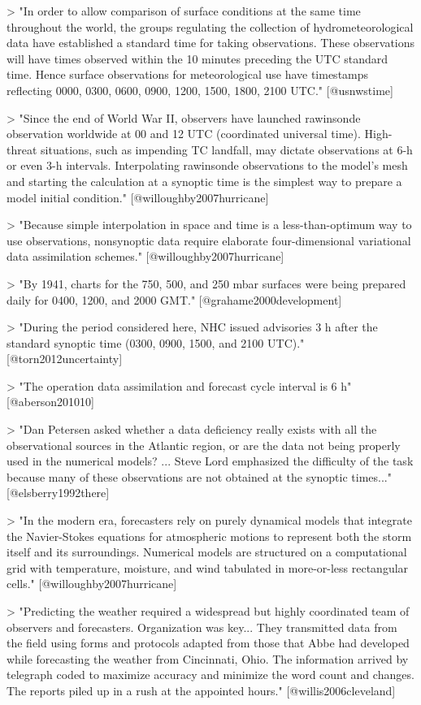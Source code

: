 > "In order to allow comparison of surface conditions at the same time
throughout the world, the groups regulating the collection of
hydrometeorological data have established a standard time for taking
observations. These observations will have times observed within the 10 minutes
preceding the UTC standard time. Hence surface observations for meteorological
use have timestamps reflecting 0000, 0300, 0600, 0900, 1200, 1500, 1800, 2100
UTC." [@usnwstime]

> "Since the end of World War II, observers have launched rawinsonde observation
worldwide at 00 and 12 UTC (coordinated universal time). High-threat situations,
such as impending TC landfall, may dictate observations at 6-h or even 3-h
intervals. Interpolating rawinsonde observations to the model's mesh and
starting the calculation at a synoptic time is the simplest way to prepare a
model initial condition." [@willoughby2007hurricane]

> "Because simple interpolation in space and time is a less-than-optimum way to
use observations, nonsynoptic data require elaborate four-dimensional
variational data assimilation schemes." [@willoughby2007hurricane]

> "By 1941, charts for the 750, 500, and 250 mbar surfaces were being prepared
daily for 0400, 1200, and 2000 GMT." [@grahame2000development]

> "During the period considered here, NHC issued advisories 3 h after the
standard synoptic time (0300, 0900, 1500, and 2100 UTC)." [@torn2012uncertainty]

> "The operation data assimilation and forecast cycle interval is 6 h"
[@aberson201010]

> "Dan Petersen asked whether a data deficiency really exists with all the
observational sources in the Atlantic region, or are the data not being properly
used in the numerical models? ... Steve Lord emphasized the difficulty of the
task because many of these observations are not obtained at the synoptic
times..." [@elsberry1992there]

> "In the modern era, forecasters rely on purely dynamical models that integrate
the Navier-Stokes equations for atmospheric motions to represent both the storm
itself and its surroundings. Numerical models are structured on a computational
grid with temperature, moisture, and wind tabulated in more-or-less rectangular
cells." [@willoughby2007hurricane]

> "Predicting the weather required a widespread but highly coordinated team of
observers and forecasters. Organization was key... They transmitted data from
the field using forms and protocols adapted from those that Abbe had developed
while forecasting the weather from Cincinnati, Ohio. The information arrived by
telegraph coded to maximize accuracy and minimize the word count and changes.
The reports piled up in a rush at the appointed hours." [@willis2006cleveland]

